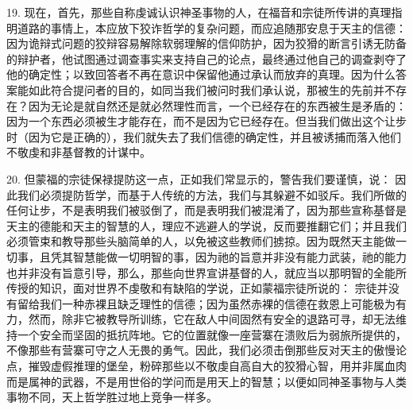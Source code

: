 19. 现在，首先，那些自称虔诚认识神圣事物的人，在福音和宗徒所传讲的真理指明道路的事情上，本应放下狡诈哲学的复杂问题，而应追随那安息于天主的信德：因为诡辩式问题的狡辩容易解除软弱理解的信仰防护，因为狡猾的断言引诱无防备的辩护者，他试图通过调查事实来支持自己的论点，最终通过他自己的调查剥夺了他的确定性；以致回答者不再在意识中保留他通过承认而放弃的真理。因为什么答案能如此符合提问者的目的，如同当我们被问时我们承认说，那被生的先前并不存在？因为无论是就自然还是就必然理性而言，一个已经存在的东西被生是矛盾的：因为一个东西必须被生才能存在，而不是因为它已经存在。但当我们做出这个让步时（因为它是正确的），我们就失去了我们信德的确定性，并且被诱捕而落入他们不敬虔和非基督教的计谋中。\par

20. 但蒙福的宗徒保禄提防这一点，正如我们常显示的，警告我们要谨慎，说：  因此我们必须提防哲学，而基于人传统的方法，我们与其躲避不如驳斥。我们所做的任何让步，不是表明我们被驳倒了，而是表明我们被混淆了，因为那些宣称基督是天主的德能和天主的智慧的人，理应不逃避人的学说，反而要推翻它们；并且我们必须管束和教导那些头脑简单的人，以免被这些教师们掳掠。因为既然天主能做一切事，且凭其智慧能做一切明智的事，因为祂的旨意并非没有能力武装，祂的能力也并非没有旨意引导，那么，那些向世界宣讲基督的人，就应当以那明智的全能所传授的知识，面对世界不虔敬和有缺陷的学说，正如蒙福宗徒所说的： 宗徒并没有留给我们一种赤裸且缺乏理性的信德；因为虽然赤裸的信德在救恩上可能极为有力，然而，除非它被教导所训练，它在敌人中间固然有安全的退路可寻，却无法维持一个安全而坚固的抵抗阵地。它的位置就像一座营寨在溃败后为弱旅所提供的，不像那些有营寨可守之人无畏的勇气。因此，我们必须击倒那些反对天主的傲慢论点，摧毁虚假推理的堡垒，粉碎那些以不敬虔自高自大的狡猾心智，用并非属血肉而是属神的武器，不是用世俗的学问而是用天上的智慧；以便如同神圣事物与人类事物不同，天上哲学胜过地上竞争一样多。\par

